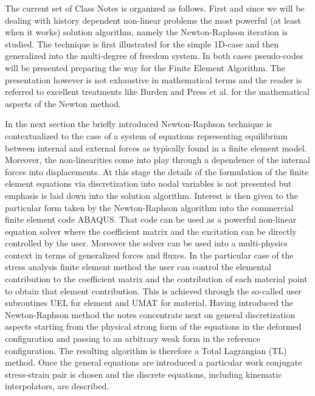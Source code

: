 The current set of Class Notes is organized as follows.  First and since we will be dealing with history dependent non-linear problems the most powerful (at least when it works) solution algorithm, namely the Newton-Raphson iteration is studied.  The technique is first illustrated for the simple 1D-case and then generalized into the multi-degree of freedom system.  In both cases pseudo-codes will be presented preparing the way for the Finite Element Algorithm.  The presentation however is not exhaustive in mathematical terms and the reader is referred to excellent treatments like Burden \cite{book:burden2011} and Press et al. \cite{book:numerical_recipes} for the mathematical aspects of the Newton method.

In the next section the briefly introduced Newton-Raphson technique is contextualized to the case of a system of equations representing equilibrium between internal and external forces as typically found in a finite element model.  Moreover, the non-linearities come into play through a dependence of the internal forces into displacements.  At this stage the details of the formulation of the finite element equations via discretization into nodal variables is not presented but emphasis is laid down into the solution algorithm.  Interest is then given to the particular form taken by the Newton-Raphson algorithm into the commercial finite element code ABAQUS.  That code can be used as a powerful non-linear equation solver where the coefficient matrix and the excitation can be directly controlled by the user.  Moreover the solver can be used into a multi-physics context in terms of generalized forces and fluxes.  In the particular case of the stress analysis finite element method the user can control the elemental contribution to the coefficient matrix and the contribution of each material point to obtain that element contribution.  This is achieved through the so-called user subroutines UEL  for element and UMAT  for material.  Having introduced the Newton-Raphson method the notes concentrate next on general discretization aspects starting from the physical strong form of the equations in the deformed configuration and passing to an arbitrary weak form in the reference configuration.  The resulting algorithm is therefore a Total Lagrangian (TL) method.  Once the general equations are introduced a particular work conjugate stress-strain pair is chosen and the discrete equations, including kinematic interpolators, are described.

